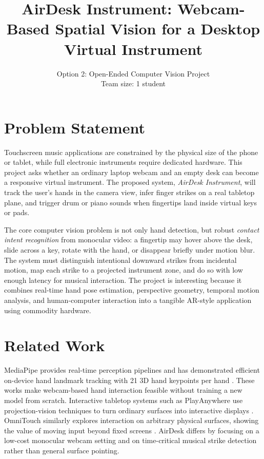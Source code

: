 \documentclass[10pt]{article}
\title{\vspace{-1.2em}\textbf{AirDesk Instrument: Webcam-Based Spatial Vision for a Desktop Virtual Instrument}}
\author{Option 2: Open-Ended Computer Vision Project \\ Team size: 1 student}
\date{}
\begin{document}
\maketitle
\vspace{-1.7em}

\section{Problem Statement}
Touchscreen music applications are constrained by the physical size of the phone or tablet, while full electronic instruments require dedicated hardware. This project asks whether an ordinary laptop webcam and an empty desk can become a responsive virtual instrument. The proposed system, \textit{AirDesk Instrument}, will track the user's hands in the camera view, infer finger strikes on a real tabletop plane, and trigger drum or piano sounds when fingertips land inside virtual keys or pads.

The core computer vision problem is not only hand detection, but robust \textit{contact intent recognition} from monocular video: a fingertip may hover above the desk, slide across a key, rotate with the hand, or disappear briefly under motion blur. The system must distinguish intentional downward strikes from incidental motion, map each strike to a projected instrument zone, and do so with low enough latency for musical interaction. The project is interesting because it combines real-time hand pose estimation, perspective geometry, temporal motion analysis, and human-computer interaction into a tangible AR-style application using commodity hardware.

\section{Related Work}
MediaPipe provides real-time perception pipelines and has demonstrated efficient on-device hand landmark tracking with 21 3D hand keypoints per hand \cite{lugaresi2019mediapipe,zhang2020mediapipehands}. These works make webcam-based hand interaction feasible without training a new model from scratch. Interactive tabletop systems such as PlayAnywhere use projection-vision techniques to turn ordinary surfaces into interactive displays \cite{wilson2005playanywhere}. OmniTouch similarly explores interaction on arbitrary physical surfaces, showing the value of moving input beyond fixed screens \cite{harrison2011omnitouch}. AirDesk differs by focusing on a low-cost monocular webcam setting and on time-critical musical strike detection rather than general surface pointing.
\end{document}
